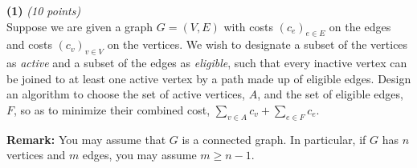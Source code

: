 \documentclass[12pt]{article}
\def\bigap{0.25in}
\begin{document}
\setlength{\parindent}{0in}
\addtolength{\parskip}{0.1cm}
\setlength{\fboxrule}{.5mm}\setlength{\fboxsep}{1.2mm}
\newlength{\boxlength}\setlength{\boxlength}{\textwidth}
\addtolength{\boxlength}{-4mm}
\begin{center}
\end{center}
\vspace{5mm}

{\bf (1)} {\em (10 points)} \\
Suppose we are given a graph $G=(V,E)$ with 
costs $(c_e)_{e \in E}$ on the edges and costs
$(c_v)_{v \in V}$ on the vertices.  We wish to
designate a subset of the vertices as \emph{active}
and a subset of the edges as \emph{eligible},
such that every inactive vertex can be joined
to at least one active vertex by a path made up
of eligible edges.  Design an algorithm
to choose the set of active vertices, $A$, and
the set of eligible edges, $F$, so as to 
minimize their combined cost,
$\sum_{v \in A} c_v + \sum_{e \in F} c_e.$

\textbf{Remark:} You may assume that $G$ is a 
connected graph. In particular, if $G$ has $n$
vertices and $m$ edges, you may assume $m \geq n-1$.



\vskip \bigap

\end{document}

